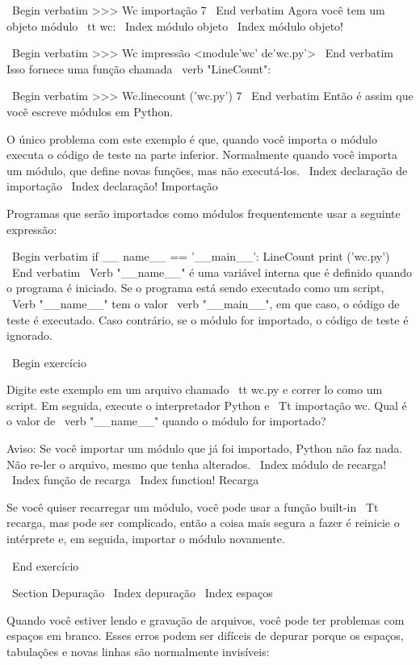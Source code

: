 \documentclass[10pt]{book}
\begin{document}
{{{{{{{{{{{\ Begin {verbatim}
>>> Wc importação
7
\ End {verbatim}
%
Agora você tem um objeto módulo {\ tt wc}:
\ Index {módulo objeto}
\ Index {módulo objeto!}

\ Begin {verbatim}
>>> Wc impressão
<module'wc' de'wc.py'>
\ End {verbatim}
%
Isso fornece uma função chamada \ verb "LineCount":

\ Begin {verbatim}
>>> Wc.linecount ('wc.py')
7
\ End {verbatim}
%
Então é assim que você escreve módulos em Python.

O único problema com este exemplo é que, quando você importa
o módulo executa o código de teste na parte inferior. Normalmente
quando você importa um módulo, que define novas funções, mas
não executá-los.
\ Index {declaração de importação}
\ Index {declaração! Importação}

Programas que serão importados como módulos frequentemente
usar a seguinte expressão:

\ Begin {verbatim}
if __ name__ == '__main__':
    LineCount print ('wc.py')
\ End {verbatim}
%
\ Verb "__name__" é uma variável interna que é definido quando o
programa é iniciado. Se o programa está sendo executado como um script,
\ Verb "__name__" tem o valor \ verb "__main__", em que
caso, o código de teste é executado. Caso contrário,
se o módulo for importado, o código de teste é ignorado.

\ Begin {} exercício

Digite este exemplo em um arquivo chamado {\ tt wc.py} e correr
lo como um script. Em seguida, execute o interpretador Python e
{\ Tt importação wc}. Qual é o valor de \ verb "__name__"
quando o módulo for importado?

Aviso: Se você importar um módulo que já foi importado,
Python não faz nada. Não re-ler o arquivo, mesmo que tenha
alterados.
\ Index {módulo de recarga!}
\ Index {função de recarga}
\ Index {function! Recarga}

Se você quiser recarregar um módulo, você pode usar a função built-in 
{\ Tt recarga}, mas pode ser complicado, então a coisa mais segura a fazer é
reinicie o intérprete e, em seguida, importar o módulo novamente.

\ End {} exercício



\ Section {} Depuração
\ Index {depuração}
\ Index {espaços}

Quando você estiver lendo e gravação de arquivos, você pode ter problemas
com espaços em branco. Esses erros podem ser difíceis de depurar porque os espaços,
tabulações e novas linhas são normalmente invisíveis:

}}}}}}}}}}}
\end{document}
